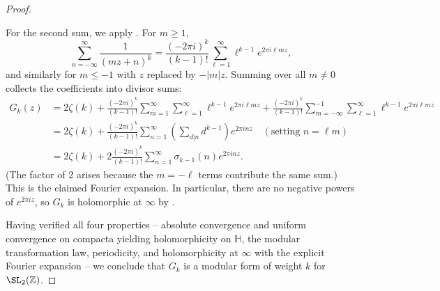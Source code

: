 \begin{proof}
\begin{enumerate}
  For the second sum, we apply . For $m \geq 1$,
  $$\sum_{n=-\infty}^{\infty} \frac{1}{(mz + n)^k} = \frac{(-2\pi i)^k}{(k-1)!} \sum_{\ell=1}^{\infty} \ell^{k-1} e^{2\pi i \ell m z},$$
  and similarly for $m \leq -1$ with $z$ replaced by $-|m|z$. Summing over all $m \neq 0$ collects the coefficients into divisor sums:
  \begin{align*}
    G_k(z) &= 2\zeta(k) + \frac{(-2\pi i)^k}{(k-1)!} \sum_{m=1}^{\infty} \sum_{\ell=1}^{\infty} \ell^{k-1} e^{2\pi i \ell m z} + \frac{(-2\pi i)^k}{(k-1)!} \sum_{m=-\infty}^{-1} \sum_{\ell=1}^{\infty} \ell^{k-1} e^{2\pi i \ell m z} \\
    &= 2\zeta(k) + \frac{(-2\pi i)^k}{(k-1)!} \sum_{n=1}^{\infty} \left( \sum_{d|n} d^{k-1} \right) e^{2\pi i n z} \quad (\text{setting } n = \ell m) \\
    &= 2\zeta(k) + 2\frac{(-2\pi i)^k}{(k-1)!} \sum_{n=1}^{\infty} \sigma_{k-1}(n) e^{2\pi i n z}.
  \end{align*}
  (The factor of $2$ arises because the $m = -\ell$ terms contribute the same sum.) This is the claimed Fourier expansion. In particular, there are no negative powers of $e^{2\pi i z}$, so $G_k$ is holomorphic at $\infty$ by .
\end{enumerate}
  Having verified all four properties -- absolute convergence and uniform convergence on compacta yielding holomorphicity on $\mathbb{H}$, the modular transformation law, periodicity, and holomorphicity at $\infty$ with the explicit Fourier expansion -- we conclude that $G_k$ is a modular form of weight $k$ for $\SL_2(\mathbb{Z})$.
\end{proof}